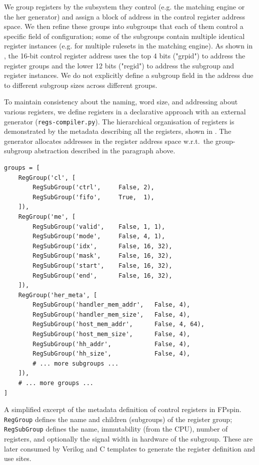 We group registers by the subsystem they control (e.g. the matching engine or the \ac{her} generator) and assign a block of address in the control register address space.  We then refine these groups into subgroups that each of them control a specific field of configuration; some of the subgroups contain multiple identical register instances (e.g. for multiple rulesets in the matching engine).  As shown in , the 16-bit control register address uses the top 4 bits ("grpid") to address the register groups and the lower 12 bits ("regid") to address the subgroup and register instances.  We do not explicitly define a subgroup field in the address due to different subgroup sizes across different groups.

To maintain consistency about the naming, word size, and addressing about various registers, we define registers in a declarative approach with an external generator (\texttt{regs-compiler.py}).  The hierarchical organisation of registers is demonstrated by the metadata describing all the registers, shown in .  The generator allocates addresses in the register address space w.r.t.\ the group-subgroup abstraction described in the paragraph above.

\begin{listing}[tp]
\begin{verbatim}
groups = [
    RegGroup('cl', [
        RegSubGroup('ctrl',     False, 2),
        RegSubGroup('fifo',     True,  1),
    ]),
    RegGroup('me', [
        RegSubGroup('valid',    False, 1, 1),
        RegSubGroup('mode',     False, 4, 1),
        RegSubGroup('idx',      False, 16, 32),
        RegSubGroup('mask',     False, 16, 32),
        RegSubGroup('start',    False, 16, 32),
        RegSubGroup('end',      False, 16, 32),
    ]),
    RegGroup('her_meta', [
        RegSubGroup('handler_mem_addr',   False, 4),
        RegSubGroup('handler_mem_size',   False, 4),
        RegSubGroup('host_mem_addr',      False, 4, 64),
        RegSubGroup('host_mem_size',      False, 4),
        RegSubGroup('hh_addr',            False, 4),
        RegSubGroup('hh_size',            False, 4),
        # ... more subgroups ...
    ]),
    # ... more groups ...
]
\end{verbatim}
\caption{A simplified excerpt of the metadata definition of control registers in FP\acs{spin}.  \texttt{RegGroup} defines the name and children (subgroups) of the register group; \texttt{RegSubGroup} defines the name, immutability (from the CPU), number of registers, and optionally the signal width in hardware of the subgroup.  These are later consumed by Verilog and C templates to generate the register definition and use sites.} \label{lst:reg-meta}
\end{listing}

